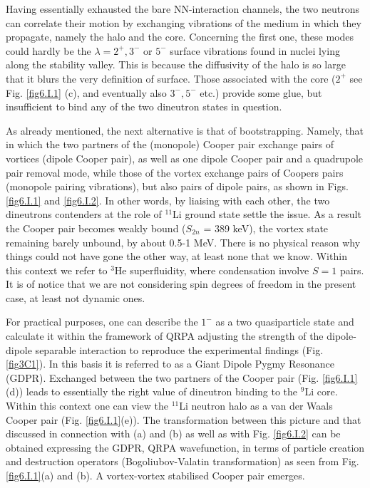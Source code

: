 \begin{subappendices}
Having essentially exhausted the bare NN-interaction channels, the two neutrons can correlate their motion by exchanging vibrations of the medium in which they propagate, namely  the halo and the core. Concerning the first one, these modes could hardly  be the $\lambda= 2^+,3^-$ or $5^-$ surface vibrations found in 
nuclei lying along the  stability valley. This is because the diffusivity of the halo is so large that it blurs the very definition of surface. Those associated with  the core ($ 2^+$ see Fig. \ref{fig6.I.1} (c), and eventually also $3^-,5^-$ etc.) provide some glue, but insufficient to bind any of the two dineutron states in question.

As already mentioned, the next alternative is that of bootstrapping. Namely, that in which the two partners of the  (monopole) Cooper pair exchange  pairs of vortices 
(dipole Cooper pair),  as well as one dipole Cooper pair and a quadrupole pair removal mode,
while those of the vortex exchange  pairs of Coopers pairs (monopole pairing vibrations), but also pairs of dipole pairs, as shown in Figs. \ref{fig6.I.1} and \ref{fig6.I.2}.  In other words, by  liaising  with each other,  
the two dineutrons contenders at the role of $^{11}$Li ground state  settle the issue.  As a result  the Cooper pair becomes weakly bound ($S_{2n}$ = 389 keV), the vortex state remaining barely unbound, by about 0.5-1 MeV.
There is no physical reason why things could not have gone  the other way, at least none that we know. Within this context we refer to $^3$He superfluidity, where condensation involve $S=1$ pairs. It is of notice that we are not considering spin degrees of freedom in  the present case,
at least  not dynamic ones. 

For practical purposes, one can describe the  $1^-$ as a two quasiparticle state and calculate it within  the framework of QRPA adjusting the strength of the dipole-dipole separable interaction to reproduce the  experimental findings (Fig. \ref{fig3C1}). In this basis it is referred to  as a Giant Dipole Pygmy Resonance (GDPR). Exchanged between the  two partners of the Cooper pair (Fig. \ref{fig6.I.1}(d)) leads to essentially the right value of  dineutron binding  to the $^9$Li core. Within this context  one can view the
$^{11}$Li neutron halo as a van der Waals Cooper pair (Fig. \ref{fig6.I.1}(e)). The transformation between this picture and  that discussed in connection with 
(a) and (b) as well as with Fig. \ref{fig6.I.2} can be obtained  expressing the GDPR, QRPA wavefunction, in terms of particle  creation and destruction operators (Bogoliubov-Valatin transformation) as seen from Fig. \ref{fig6.I.1}(a) and (b). 
A vortex-vortex  stabilised Cooper pair emerges. 


\end{subappendices}
